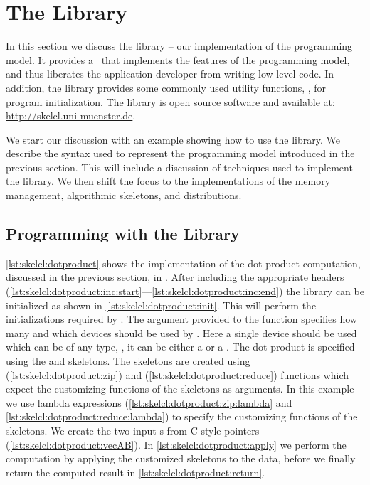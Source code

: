 \section{The \SkelCL Library}
\label{section:skelcl-library}
In this section we discuss the \SkelCL library -- our implementation of the \SkelCL programming model.
It provides a \Cpp~\API that implements the features of the \SkelCL programming model, and thus liberates the application developer from writing low-level code.
In addition, the library provides some commonly used utility functions, \eg, for program initialization.
The \SkelCL library is open source software and available at: \url{http://skelcl.uni-muenster.de}.

We start our discussion with an example showing how to use the \SkelCL library.
We describe the syntax used to represent the \SkelCL programming model introduced in the previous section.
This will include a discussion of \Cpp techniques used to implement the library.
We then shift the focus to the implementations of the memory management, algorithmic skeletons, and distributions.










\subsection{Programming with the \SkelCL Library}

\autoref{lst:skelcl:dotproduct} shows the implementation of the dot product computation, discussed in the previous section, in \SkelCL.
After including the appropriate \SkelCL headers (\autoref{lst:skelcl:dotproduct:inc:start}---\autoref{lst:skelcl:dotproduct:inc:end}) the \SkelCL library can be initialized as shown in \autoref{lst:skelcl:dotproduct:init}.
This will perform the initializations required by \OpenCL.
The argument provided to the  function specifies how many and which \OpenCL devices should be used by \SkelCL.
Here a single device should be used which can be of any type, \ie, it can be either a \CPU or a \GPU.
The dot product is specified using the \zip and \reduce skeletons.
The skeletons are created using  (\autoref{lst:skelcl:dotproduct:zip}) and  (\autoref{lst:skelcl:dotproduct:reduce}) functions which expect the customizing functions of the skeletons as arguments.
In this example we use \Cpp lambda expressions (\autoref{lst:skelcl:dotproduct:zip:lambda} and \autoref{lst:skelcl:dotproduct:reduce:lambda}) to specify the customizing functions of the skeletons.
We create the two input s from C style pointers (\autoref{lst:skelcl:dotproduct:vecAB}).
In \autoref{lst:skelcl:dotproduct:apply} we perform the computation by applying the customized skeletons to the data, before we finally return the computed result in \autoref{lst:skelcl:dotproduct:return}.

